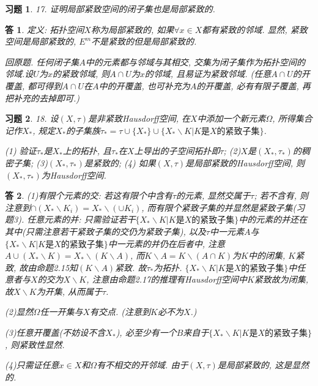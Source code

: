 \documentclass{ctexart}%
\newtheorem*{exercise}{习题}
\newtheorem*{solution}{答}
\theoremstyle{definition}
\theoremstyle{remark}
\begin{document}
\begin{exercise}17. 证明局部紧致空间的闭子集也是局部紧致的.
\end{exercise}
\begin{solution}
定义: 拓扑空间$X$称为局部紧致的, 如果$\forall x\in X$都有紧致的邻域. 显然, 紧致空间是局部紧致的, $E^m$不是紧致的但是局部紧致的. 

回原题. 任何闭子集$A$中的元素都与邻域与其相交, 交集为闭子集作为拓扑空间的邻域.设$U$为$x$的紧致邻域, 则$A\cap U$为$x$的邻域, 且易证为紧致邻域. (任意$A\cap U$的开覆盖, 都可得到$A \cap U$在$A$中的开覆盖, 也可补充为$A$的开覆盖, 必有有限子覆盖, 再把补充的去掉即可.) 
\end{solution}


\begin{exercise}18. 设$(X,\tau)$是非紧致Hausdorff空间, 在$X$中添加一个新元素$\Omega$, 所得集合记作$X_*$, 规定$X_*$的子集族$\tau_*=\tau\cup\{X_*\} \cup\{X_*\backslash K|K\text{是}X\text{的紧致子集}\}$.

(1) 验证$\tau_*$是$X_*$上的拓扑, 且$\tau_*$在$X$上导出的子空间拓扑即$\tau$; (2)$X$是$(X_*,\tau_*)$的稠密子集; (3)$(X_*,\tau_*)$是紧致的; (4) 如果$(X,\tau)$是局部紧致的Hausdorff空间, 则$(X_*,\tau_*)$为Hausdorff空间.
\end{exercise}
\begin{solution}
(1)有限个元素的交: 若这有限个中含有$\tau$的元素, 显然交属于$\tau$; 若不含有, 则注意到$\cap(X_*\backslash K_i)=X_*\backslash (\cup K_i)$, 而有限个紧致子集的并显然是紧致子集(习题3). 任意元素的并: 只需验证若干$\{X_*\backslash K|K\text{是}X\text{的紧致子集}\}$中的元素的并还在其中(只需注意若干紧致子集的交仍为紧致子集), 以及$\tau$中一元素$A$与$\{X_*\backslash K|K\text{是}X\text{的紧致子集}\}$中一元素的并仍在后者中, 注意$A\cup (X_*\backslash K)=X_*\backslash (K\backslash A)$, 而$K\backslash A
= K\backslash (A\cap K)$为$K$中的闭集, $K$紧致, 故由命题2.15知$(K\backslash A)$紧致. 故$\tau_*$为拓扑. 
$\{X_*\backslash K|K\text{是}X\text{的紧致子集}\}$中任意者与$X$的交为$X\backslash K$, 注意由命题2.17的推理有Hausdorff空间中$K$紧致故为闭集, 故$X\backslash K$为开集, 从而属于$\tau$. 

(2)显然$\Omega$任一开集与$X$有交点. (注意到$K$必不为$X$.)

(3)任意开覆盖(不妨设不含$X_*$), 必至少有一个$B$来自于$\{X_*\backslash K|K\text{是}X\text{的紧致子集}\}$, 则紧致性显然.

(4)只需证任意$x\in X$和$\Omega$有不相交的开邻域. 由于$(X,\tau)$是局部紧致的, 这是显然的.
\end{solution}
\end{document}
